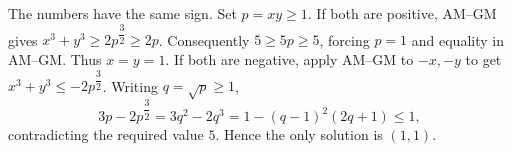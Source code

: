 The numbers have the same sign. Set $p=xy\ge1$.
If both are positive, AM--GM gives $x^3+y^3\ge2p^{\dfrac{3}{2}}\ge2p$. Consequently $5\ge5p\ge5$, forcing $p=1$ and equality in AM--GM. Thus $x=y=1$.
If both are negative, apply AM--GM to $-x,-y$ to get $x^3+y^3\le-2p^{\dfrac{3}{2}}$. Writing $q=\sqrt p\ge1$,
\[
3p-2p^{\dfrac{3}{2}}=3q^2-2q^3
=1-(q-1)^2(2q+1)\le1,
\]
contradicting the required value $5$. Hence the only solution is $\boxed{(1,1)}$.
